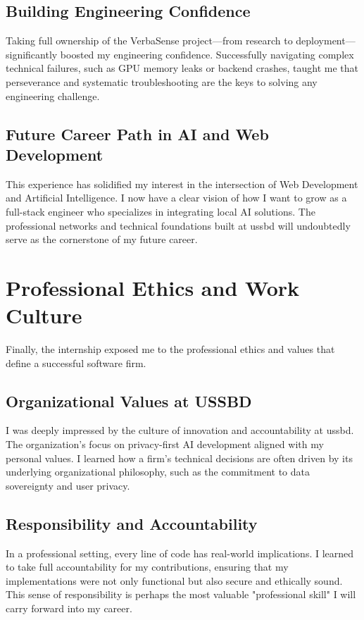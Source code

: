 \documentclass[oneside]{thesis-library}
\begin{document}
\subsection{Building Engineering Confidence}
Taking full ownership of the VerbaSense project—from research to deployment—significantly boosted my engineering confidence. Successfully navigating complex technical failures, such as GPU memory leaks or backend crashes, taught me that perseverance and systematic troubleshooting are the keys to solving any engineering challenge.

\subsection{Future Career Path in AI and Web Development}
This experience has solidified my interest in the intersection of Web Development and Artificial Intelligence. I now have a clear vision of how I want to grow as a full-stack engineer who specializes in integrating local AI solutions. The professional networks and technical foundations built at \Gls{ussbd} will undoubtedly serve as the cornerstone of my future career.

\section{Professional Ethics and Work Culture}
Finally, the internship exposed me to the professional ethics and values that define a successful software firm.

\subsection{Organizational Values at USSBD}
I was deeply impressed by the culture of innovation and accountability at \Gls{ussbd}. The organization’s focus on privacy-first AI development aligned with my personal values. I learned how a firm’s technical decisions are often driven by its underlying organizational philosophy, such as the commitment to data sovereignty and user privacy.

\subsection{Responsibility and Accountability}
In a professional setting, every line of code has real-world implications. I learned to take full accountability for my contributions, ensuring that my implementations were not only functional but also secure and ethically sound. This sense of responsibility is perhaps the most valuable "professional skill" I will carry forward into my career.
\end{document}
